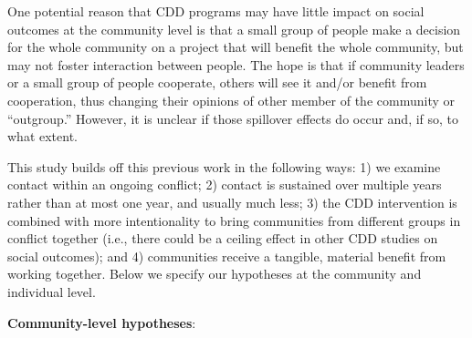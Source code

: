 \documentclass[
]{article}
\begin{document}
One potential reason that CDD programs may have little impact on social
outcomes at the community level is that a small group of people make a
decision for the whole community on a project that will benefit the
whole community, but may not foster interaction between people. The hope
is that if community leaders or a small group of people cooperate,
others will see it and/or benefit from cooperation, thus changing their
opinions of other member of the community or ``outgroup.'' However, it
is unclear if those spillover effects do occur and, if so, to what
extent.

This study builds off this previous work in the following ways: 1) we
examine contact within an ongoing conflict; 2) contact is sustained over
multiple years rather than at most one year, and usually much less; 3)
the CDD intervention is combined with more intentionality to bring
communities from different groups in conflict together (i.e., there
could be a ceiling effect in other CDD studies on social outcomes); and
4) communities receive a tangible, material benefit from working
together. Below we specify our hypotheses at the community and
individual level.

\textbf{Community-level hypotheses}:
\end{document}
